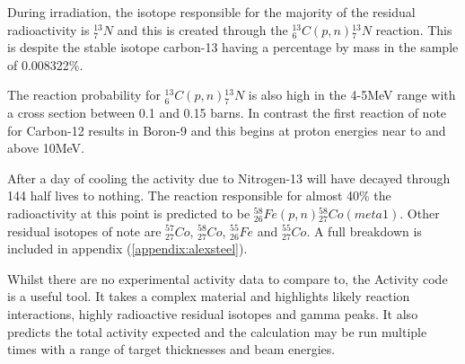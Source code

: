 During irradiation, the isotope responsible for the majority of the residual radioactivity is ${}^{13}_{7}N$ and this is created through the ${}^{13}_{6}C(p, n){}^{13}_{7}N$ reaction.  This is despite the stable isotope carbon-13 having a percentage by mass in the sample of 0.008322\%.

The reaction probability for ${}^{13}_{6}C(p, n){}^{13}_{7}N$ is also high in the 4-5MeV range with a cross section between 0.1 and 0.15 barns.  In contrast the first reaction of note for Carbon-12 results in Boron-9 and this begins at proton energies near to and above 10MeV.

After a day of cooling the activity due to Nitrogen-13 will have decayed through 144 half lives to nothing.  The reaction responsible for almost 40\% the radioactivity at this point is predicted to be ${}^{58}_{26}Fe(p, n){}^{58}_{27}Co (meta 1)$.  Other residual isotopes of note are ${}^{57}_{27}Co$, ${}^{58}_{27}Co$, ${}^{55}_{26}Fe$ and ${}^{55}_{27}Co$.  A full breakdown is included in appendix (\ref{appendix:alexsteel}).

Whilst there are no experimental activity data to compare to, the Activity code is a useful tool.  It takes a complex material and highlights likely reaction interactions, highly radioactive residual isotopes and gamma peaks.  It also predicts the total activity expected and the calculation may be run multiple times with a range of target thicknesses and beam energies.


















